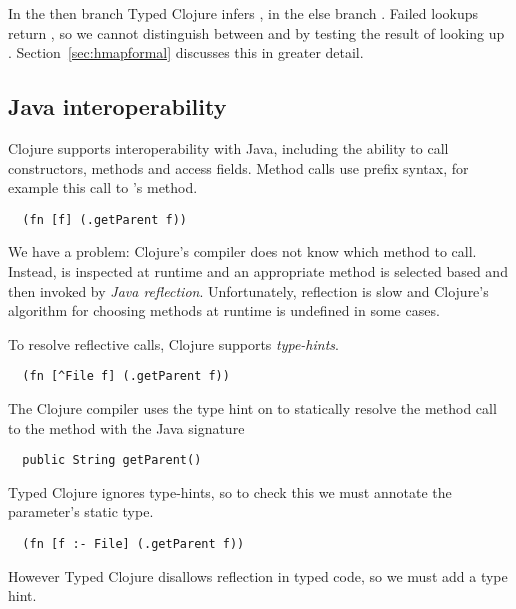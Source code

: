 In the then branch Typed Clojure infers , in the else branch
. Failed lookups return ,
so we cannot distinguish between  and 
by testing the result of looking up .
Section~\ref{sec:hmapformal} discusses this in greater detail.

\subsection{Java interoperability}

Clojure supports interoperability with Java, including the ability to
call constructors, methods and access fields.
Method calls use prefix syntax, for example this call to 
's  method.

\begin{verbatim}
  (fn [f] (.getParent f))
\end{verbatim}

We have a problem: Clojure's compiler does not know which method to call.
Instead,  is inspected at runtime and an appropriate method is selected based
and then invoked by \emph{Java reflection}.
Unfortunately, reflection is slow and Clojure's algorithm for
choosing methods at runtime is undefined in some cases.

To resolve reflective calls, Clojure supports \emph{type-hints}.

\begin{verbatim}
  (fn [^File f] (.getParent f))
\end{verbatim}

The Clojure compiler uses the type hint on 
to statically resolve the method call to the 
method with the Java signature

\begin{verbatim}
  public String getParent()
\end{verbatim}

Typed Clojure ignores type-hints, so to check this we must
annotate the parameter's static type.

\begin{verbatim}
  (fn [f :- File] (.getParent f))
\end{verbatim}

However Typed Clojure disallows reflection in typed code, so we
must add a type hint.

\inputminted[firstline=10,lastline=10]{clojure}{code/demo/src/demo/parent3.clj}

